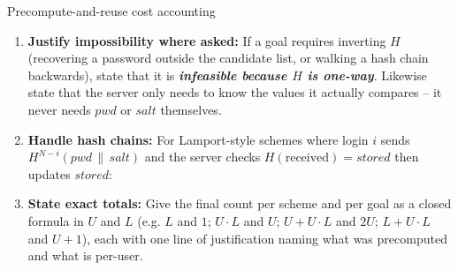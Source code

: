 \documentclass[12pt, a4paper]{article}
\newcommand{\term}[1]{\textbf{\textit{#1}}}        %
\begin{document}
\begin{schemebox}{Precompute-and-reuse cost accounting}
\begin{enumerate}[label=\textbf{Step \arabic*:}, leftmargin=*]
    \item \textbf{Justify impossibility where asked:} If a goal requires inverting $H$ (recovering a password outside the candidate list, or walking a hash chain backwards), state that it is \term{infeasible because $H$ is one-way}. Likewise state that the server only needs to know the values it actually compares -- it never needs $pwd$ or $salt$ themselves.
    \item \textbf{Handle hash chains:} For Lamport-style schemes where login $i$ sends $H^{N-i}(pwd \,\|\, salt)$ and the server checks $H(\text{received}) = stored$ then updates $stored$:
    \item \textbf{State exact totals:} Give the final count per scheme and per goal as a closed formula in $U$ and $L$ (e.g. $L$ and $1$; $U \cdot L$ and $U$; $U + U \cdot L$ and $2U$; $L + U \cdot L$ and $U + 1$), each with one line of justification naming what was precomputed and what is per-user.

\end{enumerate}
\end{schemebox}
\end{document}
